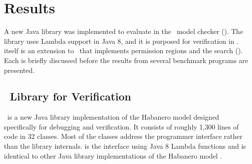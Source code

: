 \section{Results}

A new Java library was implemented to evaluate 
in the \jpf\ model checker (\hjv). The library uses Lambda support in Java 8,
and it is purposed for verification in \jpf. 
itself is an extension to \jpf\ that implements permission regions and
the search (\jpfhj).  Each is briefly discussed before the
results from several benchmark programs are presented.

\subsection{\hj\ Library for Verification}

\hjv\ is a new Java library implementation of the Habanero model designed
specifically for debugging and verification. It consists of roughly 1,300
lines of code in 32 classes. Most of the classes address the
programmer interface rather than the library
internals.  is the interface
using Java 8 Lambda functions and is identical to other Java library implementations of
the Habanero model \cite{hj-lib}.

\begin{comment}
The implementation of the \texttt{async} and \texttt{finish}
constructs uses Java threads and the ability to join those
threads. Flattening the Lambda function in the Java 8 interface to an anonymous inner class elucidates the
structure of the library. That code for the \texttt{async} call in
\figref{fig:hj-async-finish} using an anonymous inner-class is shown below:
\begin{lstlisting}
  async(new HjRunnable() {
    public void run() {
      X.push(5);
    }
  });
\end{lstlisting}
The parameter for the call is an instance of an \texttt{HjRunnable} object
object, and an \texttt{HjRunnable} is an extension to the standard Java
thread. The \texttt{run} method for the thread is specialized in the
anonymous inner-class. A programmer may use either syntax with \hjv.

Staying at a high-level view of the implementation, tasks are threads
with extra information to implement the Habanero model. To support the
\texttt{finish}-construct, that thread includes the notion of a
\emph{finish-scope}. A finish-scope holds references to any child
thread created within a \texttt{finish}-construct, and a stack of
finish-scopes tracks the nesting of \texttt{finish}-constructs within
a task. When a task is created, it is added to the current running
thread's active finish-scope. In this way, when a parent reaches the
end of a \texttt{finish}-construct, it is able to join on all threads
in the current finish-scope. After joining, the finish-scope is popped
from the stack making the next outer finish-scope the active scope.
\end{comment}

